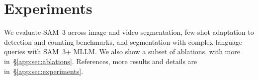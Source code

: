 \documentclass[]{fairmeta}
\newcommand{\model}{SAM~3\xspace}
\begin{document}


\vspace{-2pt}
\section{Experiments}
\label{sec:experiments}
\vspace{-2pt}
We evaluate \model across image and video segmentation, few-shot adaptation to detection and counting benchmarks, and segmentation with complex language queries with \model + MLLM. We also show a subset of ablations, with more in~\S\ref{app:sec:ablations}. References, more results and details are in~\S\ref{app:sec:experiments}.
\end{document}
